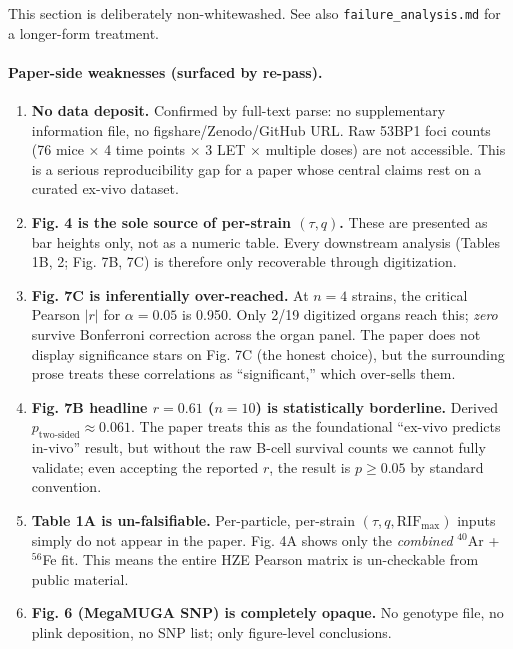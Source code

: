 \documentclass[11pt]{article}
\begin{document}
This section is deliberately non-whitewashed. See also \texttt{failure\_analysis.md}
for a longer-form treatment.

\paragraph{Paper-side weaknesses (surfaced by re-pass).}
\begin{enumerate}
    \item \textbf{No data deposit.} Confirmed by full-text parse: no supplementary
    information file, no figshare/Zenodo/GitHub URL. Raw 53BP1 foci counts (76 mice
    $\times$ 4 time points $\times$ 3 LET $\times$ multiple doses) are not accessible.
    This is a serious reproducibility gap for a paper whose central claims rest on a
    curated ex-vivo dataset.
    \item \textbf{Fig. 4 is the sole source of per-strain $(\tau, q)$.} These are
    presented as bar heights only, not as a numeric table. Every downstream analysis
    (Tables 1B, 2; Fig. 7B, 7C) is therefore only recoverable through digitization.
    \item \textbf{Fig. 7C is inferentially over-reached.} At $n=4$ strains, the
    critical Pearson $|r|$ for $\alpha=0.05$ is 0.950. Only 2/19 digitized organs
    reach this; \emph{zero} survive Bonferroni correction across the organ panel.
    The paper does not display significance stars on Fig. 7C (the honest choice),
    but the surrounding prose treats these correlations as ``significant,'' which
    over-sells them.
    \item \textbf{Fig. 7B headline $r = 0.61$ ($n=10$) is statistically borderline.}
    Derived $p_{\text{two-sided}} \approx 0.061$. The paper treats this as the
    foundational ``ex-vivo predicts in-vivo'' result, but without the raw B-cell
    survival counts we cannot fully validate; even accepting the reported $r$, the
    result is $p \geq 0.05$ by standard convention.
    \item \textbf{Table 1A is un-falsifiable.} Per-particle, per-strain
    $(\tau, q, \text{RIF}_{\max})$ inputs simply do not appear in the paper. Fig. 4A
    shows only the \emph{combined} $^{40}$Ar + $^{56}$Fe fit. This means the entire
    HZE Pearson matrix is un-checkable from public material.
    \item \textbf{Fig. 6 (MegaMUGA SNP) is completely opaque.} No genotype file, no
    plink deposition, no SNP list; only figure-level conclusions.
\end{enumerate}
\end{document}
